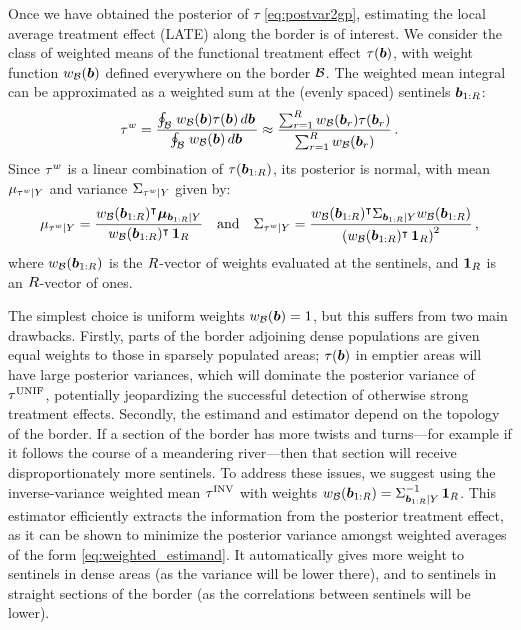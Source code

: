 \documentclass{article}
\begin{document}
Once we have obtained the posterior of \(\tau\) \eqref{eq:postvar2gp}, estimating the local average treatment effect (LATE) along the border is of interest.
We consider the class of weighted means of the functional treatment effect \(\tau\del{\sentinel}\),
with weight function \(w_{\mathcal{B}}(\bm{b})\) defined everywhere on the border \(\mathcal{B}\).
The weighted mean integral can be approximated as a weighted sum at the (evenly spaced) sentinels \(\bm{b}_{1:R}\):
\begin{equation}
    \tau^{w} = \frac{\oint_{\mathcal{B}} \left. w_{\mathcal{B}}(\bm{b}) \tau(\bm{b}) \mathop{d \bm{b}} \right.}
    {\oint_{\mathcal{B}} \left. w_{\mathcal{B}}(\bm{b}) \mathop{d \bm{b}} \right.}
    \approx \frac{\sum_{r=1}^R w_{\mathcal{B}}(\bm{b}_r) \tau(\bm{b}_r)}
    {\sum_{r=1}^R w_{\mathcal{B}}(\bm{b}_r) } \,.
\label{eq:weighted_estimand}
\end{equation}
Since \(\tau^{w}\) is a linear combination of \(\tau(\bm{b}_{1:R})\), its posterior is normal, with mean \(\mu_{\tau^{w} \mid Y}\) and variance \(\Sigma_{\tau^{w} \mid Y}\) given by:
\begin{equation}
    \mu_{\tau^{w} \mid Y} = \frac{w_{\mathcal{B}}(\bm{b}_{1:R})^{\intercal} \bm{\mu}_{\bm{b}_{1:R} \mid Y}}
    {w_{\mathcal{B}}(\bm{b}_{1:R})^{\intercal}  \operatorname{\mathbf{1}}_R}\quad\text{and}\quad
    \Sigma_{\tau^{w} \mid Y} = \frac{w_{\mathcal{B}}(\bm{b}_{1:R})^{\intercal} \Sigma_{\bm{b}_{1:R} \mid Y} w_{\mathcal{B}}(\bm{b}_{1:R})}
    { \left\lparen w_{\mathcal{B}}(\bm{b}_{1:R})^{\intercal}  \operatorname{\mathbf{1}}_R \right\rparen^2 } \,,
\label{eq:weighted_estimator}
\end{equation}
where \(w_{\mathcal{B}}(\bm{b}_{1:R})\) is the \(R\)-vector of weights evaluated at the sentinels, and \(\operatorname{\mathbf{1}}_R\) is an \(R\)-vector of ones.

The simplest choice is uniform weights \(w_{\mathcal{B}}(\bm{b})=1\), but this suffers from two main drawbacks.
Firstly, parts of the border adjoining dense populations are given equal weights to those in sparsely populated areas;
\(\tau(\bm{b})\) in emptier areas will have large posterior variances, which will dominate the posterior variance of \(\tau^{\mathrm{UNIF}}\), potentially jeopardizing the successful detection of otherwise strong treatment effects.
Secondly, the estimand and estimator depend on the topology of the border.
If a section of the border has more twists and turns---for example if it follows the course of a meandering river---then that section will receive disproportionately more sentinels.
To address these issues, we suggest using the inverse-variance weighted mean \(\tau^{\mathrm{INV}}\) with weights 
\(w_{\mathcal{B}}(\bm{b}_{1:R}) = \Sigma_{\bm{b}_{1:R} \mid Y}^{-1} \operatorname{\mathbf{1}}_{R}\).
This estimator efficiently extracts the information from the posterior treatment effect, as it can be shown to minimize the posterior variance amongst weighted averages of the form \autoref{eq:weighted_estimand}.
It automatically gives more weight to sentinels in dense areas (as the variance will be lower there), and to sentinels in straight sections of the border (as the correlations between sentinels will be lower).
\end{document}
